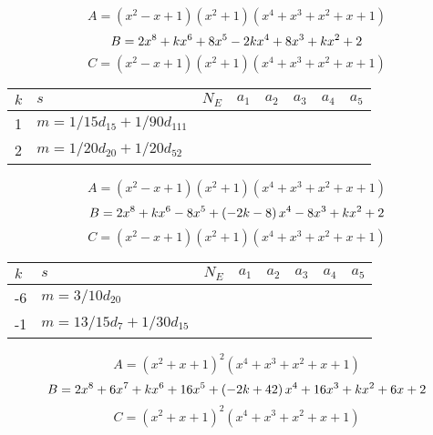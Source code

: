 \documentclass{amsart}
\begin{document}
$$A=(x^2
 - x
 + 1)(x^2
 + 1)(x^4
 + x^3
 + x^2
 + x
 + 1)$$
$$B=2\*x^8
 + k\*x^6
 + 8\*x^5
 - 2\*k\*x^4
 + 8\*x^3
 + k\*x^2
 + 2$$
$$C=(x^2
 - x
 + 1)(x^2
 + 1)(x^4
 + x^3
 + x^2
 + x
 + 1)$$
\begin{longtable}{|l|l|l|lllll|}
\hline
$k$ & $s$ & $N_E$ & $a_1$ & $a_2$ & $a_3$ & $a_4$ & $a_5$\\
\hline
1&$m=1/15d_{15}+1/90d_{111}$&&\multicolumn{5}{c|}{}\\
2&$m=1/20d_{20}+1/20d_{52}$&&\multicolumn{5}{c|}{}\\
\hline
\end{longtable}
$$A=(x^2
 - x
 + 1)(x^2
 + 1)(x^4
 + x^3
 + x^2
 + x
 + 1)$$
$$B=2\*x^8
 + k\*x^6
 - 8\*x^5
 + \left(-2\*k
 - 8\right) \*x^4
 - 8\*x^3
 + k\*x^2
 + 2$$
$$C=(x^2
 - x
 + 1)(x^2
 + 1)(x^4
 + x^3
 + x^2
 + x
 + 1)$$
\begin{longtable}{|l|l|l|lllll|}
\hline
$k$ & $s$ & $N_E$ & $a_1$ & $a_2$ & $a_3$ & $a_4$ & $a_5$\\
\hline
-6&$m=3/10d_{20}$&&\multicolumn{5}{c|}{}\\
-1&$m=13/15d_{7}+1/30d_{15}$&&\multicolumn{5}{c|}{}\\
\hline
\end{longtable}
$$A=(x^2
 + x
 + 1)^{2}(x^4
 + x^3
 + x^2
 + x
 + 1)$$
$$B=2\*x^8
 + 6\*x^7
 + k\*x^6
 + 16\*x^5
 + \left(-2\*k
 + 42\right) \*x^4
 + 16\*x^3
 + k\*x^2
 + 6\*x
 + 2$$
$$C=(x^2
 + x
 + 1)^{2}(x^4
 + x^3
 + x^2
 + x
 + 1)$$
\end{document}
